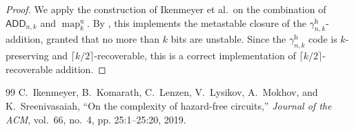 \documentclass[10pt,a4paper]{amsart}
\newcommand{\BLM}{{\textsf{ADD}}_{n,k}}
\newcommand{\ceil}[1]{\lceil{#1}\rceil}
\newcommand{\gHyb}[1]{\gamma_{#1}^{\operatorname{h}}}
\newcommand{\mUnary}[1]{\map_{#1}^{\operatorname{u}}}
\DeclareMathOperator{\map}{map}
\begin{document}
\begin{proof}
    We apply the construction of  Ikenmeyer et al.\ on the combination of $\BLM$ and $\mUnary{k}$. By \cite{ikenmeyer18complexity}, this implements the metastable closure of the $\gHyb{n,k}$-addition, granted that no more than $k$ bits are unstable. Since the $\gHyb{n,k}$ code is $k$-preserving and $\ceil{k/2}$-recoverable, this is a correct implementation of $\ceil{k/2}$-recoverable addition.
\end{proof}

\begin{thebibliography}{99}
 C.~Ikenmeyer, B.~Komarath, C.~Lenzen, V.~Lysikov, A.~Mokhov, and K.~Sreenivasaiah, ``{On the complexity of hazard-free circuits},'' \emph{Journal of the ACM}, vol.~66, no.~4, pp. 25:1--25:20, 2019.
\end{thebibliography}
\end{document}
